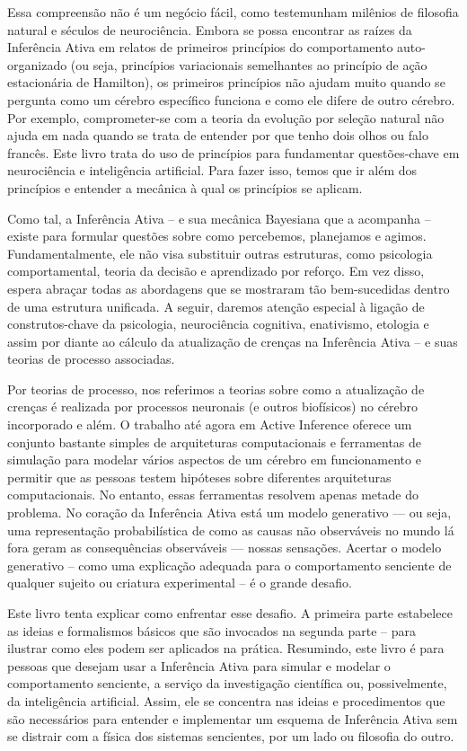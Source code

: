 \documentclass[
  12pt,
]{book}
\begin{document}
Essa compreensão não é um negócio fácil, como testemunham milênios de filosofia natural e séculos de neurociência. Embora se possa encontrar as raízes da Inferência Ativa em relatos de primeiros princípios do comportamento auto-organizado (ou seja, princípios variacionais semelhantes ao princípio de ação estacionária de Hamilton), os primeiros princípios não ajudam muito quando se pergunta como um cérebro específico funciona e como ele difere de outro cérebro. Por exemplo, comprometer-se com a teoria da evolução por seleção natural não ajuda em nada quando se trata de entender por que tenho dois olhos ou falo francês. Este livro trata do uso de princípios para fundamentar questões-chave em neurociência e inteligência artificial. Para fazer isso, temos que ir além dos princípios e entender a mecânica à qual os princípios se aplicam.

Como tal, a Inferência Ativa -- e sua mecânica Bayesiana que a acompanha -- existe para formular questões sobre como percebemos, planejamos e agimos. Fundamentalmente, ele não visa substituir outras estruturas, como psicologia comportamental, teoria da decisão e aprendizado por reforço. Em vez disso, espera abraçar todas as abordagens que se mostraram tão bem-sucedidas dentro de uma estrutura unificada. A seguir, daremos atenção especial à ligação de construtos-chave da psicologia, neurociência cognitiva, enativismo, etologia e assim por diante ao cálculo da atualização de crenças na Inferência Ativa -- e suas teorias de processo associadas.

Por teorias de processo, nos referimos a teorias sobre como a atualização de crenças é realizada por processos neuronais (e outros biofísicos) no cérebro incorporado e além. O trabalho até agora em Active Inference oferece um conjunto bastante simples de arquiteturas computacionais e ferramentas de simulação para modelar vários aspectos de um cérebro em funcionamento e permitir que as pessoas testem hipóteses sobre diferentes arquiteturas computacionais. No entanto, essas ferramentas resolvem apenas metade do problema. No coração da Inferência Ativa está um modelo generativo --- ou seja, uma representação probabilística de como as causas não observáveis no mundo lá fora geram as consequências observáveis --- nossas sensações. Acertar o modelo generativo -- como uma explicação adequada para o comportamento senciente de qualquer sujeito ou criatura experimental -- é o grande desafio.

Este livro tenta explicar como enfrentar esse desafio. A primeira parte estabelece as ideias e formalismos básicos que são invocados na segunda parte -- para ilustrar como eles podem ser aplicados na prática. Resumindo, este livro é para pessoas que desejam usar a Inferência Ativa para simular e modelar o comportamento senciente, a serviço da investigação científica ou, possivelmente, da inteligência artificial. Assim, ele se concentra nas ideias e procedimentos que são necessários para entender e implementar um esquema de Inferência Ativa sem se distrair com a física dos sistemas sencientes, por um lado ou filosofia do outro.
\end{document}
